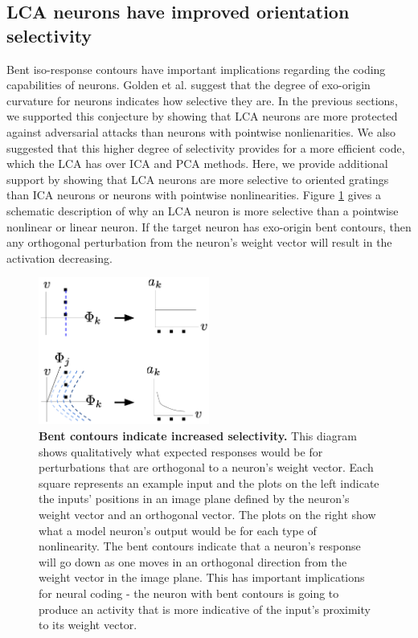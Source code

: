 \subsection{LCA neurons have improved orientation selectivity}
Bent iso-response contours have important implications regarding the coding capabilities of neurons. Golden et al. \citeyearpar{golden2016conjectures} suggest that the degree of exo-origin curvature for neurons indicates how selective they are. In the previous sections, we supported this conjecture by showing that LCA neurons are more protected against adversarial attacks than neurons with pointwise nonlienarities. We also suggested that this higher degree of selectivity provides for a more efficient code, which the LCA has over ICA and PCA methods. Here, we provide additional support by showing that LCA neurons are more selective to oriented gratings than ICA neurons or neurons with pointwise nonlinearities. Figure \ref{fig:ch4_lca_selectivity_diagram} gives a schematic description of why an LCA neuron is more selective than a pointwise nonlinear or linear neuron. If the target neuron has exo-origin bent contours, then any orthogonal perturbation from the neuron's weight vector will result in the activation decreasing.

\begin{figure}[h]
    \centering
    \includegraphics[width=0.5\textwidth]{figures/lca_selectivity_diagram.png}
    \caption{\textbf{Bent contours indicate increased selectivity.} This diagram shows qualitatively what expected responses would be for perturbations that are orthogonal to a neuron's weight vector. Each square represents an example input and the plots on the left indicate the inputs' positions in an image plane defined by the neuron's weight vector and an orthogonal vector. The plots on the right show what a model neuron's output would be for each type of nonlinearity. The bent contours indicate that a neuron's response will go down as one moves in an orthogonal direction from the weight vector in the image plane. This has important implications for neural coding - the neuron with bent contours is going to produce an activity that is more indicative of the input's proximity to its weight vector.}
    \label{fig:ch4_lca_selectivity_diagram}
\end{figure}

